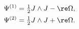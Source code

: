 \begin{equation}
\begin{aligned}
   \Psi^{(1)} = \tfrac{1}{2}J \wedge J - \re \Omega , \\   
   \Psi^{(2)} = \tfrac{1}{2}J \wedge J + \re \Omega .
\end{aligned}
\end{equation}

